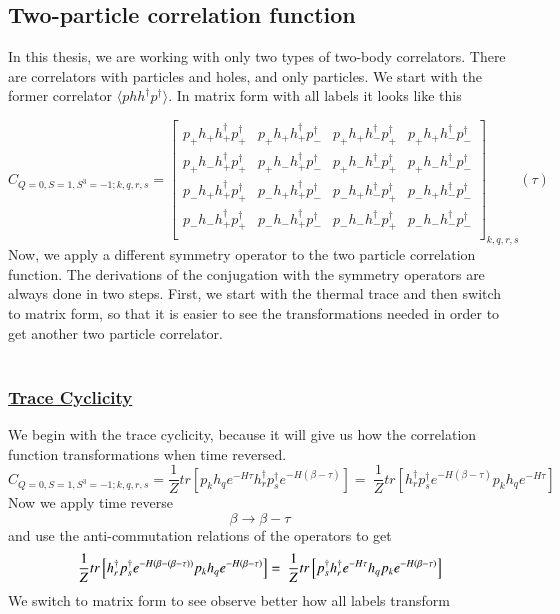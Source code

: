 \subsection{Two-particle correlation function}
\label{ssec:sym-twobody}
In this thesis, we are working with only two types of two-body correlators. There are correlators with particles and holes, and only particles. We start with the former correlator $\langle phh^\dagger p^\dagger\rangle$. In matrix form with all labels it looks like this

\newcommand{\cor}[4]{p_{#1}h_{#2}h^\dagger_{#3}p^\dagger_{#4}}
\begin{equation}
  C_{Q=0,S=1,S^3=-1;k,q,r,s} =
  \left[
  \begin{array}{cccc}
    \cor{+}{+}{+}{+} & \cor{+}{+}{+}{-} & \cor{+}{+}{-}{+} & \cor{+}{+}{-}{-} \\
    \cor{+}{-}{+}{+} & \cor{+}{-}{+}{-} & \cor{+}{-}{-}{+} & \cor{+}{-}{-}{-} \\
    \cor{-}{+}{+}{+} & \cor{-}{+}{+}{-} & \cor{-}{+}{-}{+} & \cor{-}{+}{-}{-} \\
    \cor{-}{-}{+}{+} & \cor{-}{-}{+}{-} & \cor{-}{-}{-}{+} & \cor{-}{-}{-}{-} \\
  \end{array}
  \right]_{k,q,r,s} (\tau)
  \label{eq:phhpmat}
\end{equation}
Now, we apply a different symmetry operator to the two particle correlation function. The derivations of the conjugation with the symmetry operators are always done in two steps. First, we start with the thermal trace and then switch to matrix form, so that it is easier to see the transformations needed in order to get another two particle correlator.
\\
\\
\subsubsection{\underline{Trace Cyclicity}}
We begin with the trace cyclicity, because it will give us how the correlation function transformations when time reversed.
\\
\begin{equation}
  C_{Q=0,S=1,S^3=-1;k,q,r,s} = \frac{1}{Z}tr\left[p_kh_qe^{-H\tau}h^\dagger_rp^\dagger_se^{-H\left(\beta-\tau\right)}\right] =\
  \frac{1}{Z}tr\left[h^\dagger_rp^\dagger_se^{-H\left(\beta-\tau\right)}p_kh_qe^{-H\tau}\right]
\end{equation}
Now we apply time reverse
$$\beta \rightarrow \beta - \tau$$
and use the anti-commutation relations of the operators to get
\begin{equation}
  \frac{1}{Z}tr\left[h^\dagger_rp^\dagger_se^{-H\left(\beta-\left(\beta-\tau\right)\right)}p_kh_qe^{-H\left(\beta-\tau\right)}\right]=\\\
  \frac{1}{Z}tr\left[p^\dagger_sh^\dagger_re^{-H\tau}h_qp_ke^{-H\left(\beta-\tau\right)}\right]
\end{equation}
We switch to matrix form to see observe better how all labels transform

